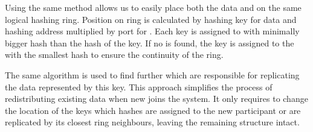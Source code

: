         Using the same method allows us to easily place both the \PHT data and \Nodes on the same logical hashing ring.
        Position on ring is calculated by hashing key for data and hashing address multiplied by port for \Nodes.
        Each key is assigned to \Node with minimally bigger hash than the hash of the key.
        If no \Node is found, the key is assigned to the \Node with the smallest hash to ensure the continuity of the ring.
            
        The same algorithm is used to find further \Nodes which are responsible for replicating the data represented by this key.
        This approach simplifies the process of redistributing existing data when new \Node joins the system.
        It only requires to change the location of the keys which hashes are assigned to the new participant or are replicated by its closest ring neighbours, leaving the remaining structure intact.
        

